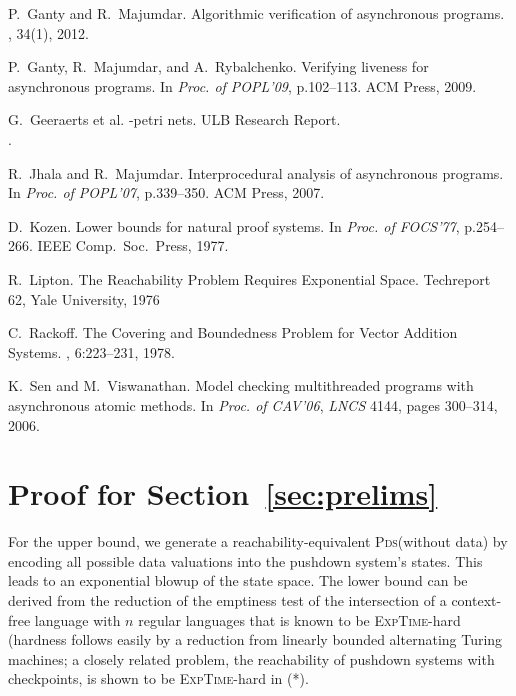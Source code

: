 \documentclass[runningheads,oribibl,]{article}
\newcommand{\pds}{\textsc{Pds}\xspace}
\newcommand{\dexptime}{\textsc{ExpTime}\xspace}
\newenvironment{proof}{\noindent{\it Proof.\hspace*{.5cm}}}{}
\begin{document}
\begin{thebibliography}{10}
P.~Ganty and R.~Majumdar.
\nb Algorithmic verification of asynchronous programs.
, 34(1), 2012.

P.~Ganty, R.~Majumdar, and A.~Rybalchenko.
\nb Verifying liveness for asynchronous programs.
\nb In {\em Proc. of POPL'09}, p.102--113. ACM Press, 2009.

G.~Geeraerts et al.
\nb {$\omega$}-petri nets.
\nb ULB Research Report.\\
\nb
{}.

R.~Jhala and R.~Majumdar.
\nb Interprocedural analysis of asynchronous programs.
\nb In {\em Proc. of POPL'07}, p.339--350. ACM Press, 2007.

D.~Kozen.
\nb Lower bounds for natural proof systems.
\nb In {\em Proc. of FOCS'77}, p.254--266. IEEE Comp.\ Soc.\ Press,
  1977.

R.~Lipton.
\nb The Reachability Problem Requires Exponential Space.
\nb  Techreport 62, Yale University, 1976

C.~Rackoff.
\nb The Covering and Boundedness Problem for Vector Addition Systems.
, 6:223–231, 1978.

K.~Sen and M.~Viswanathan.
\nb Model checking multithreaded programs with asynchronous atomic
  methods.
\nb In {\em Proc. of CAV'06}, {\em {LNCS}} 4144, pages
  300--314, 2006.

\end{thebibliography}


\clearpage
\appendix










\section{Proof for Section~\ref{sec:prelims}}
\propreachpdsdata*
\begin{proof}
  For the upper bound, we generate a reachability-equivalent
  \pds (without data)
  by encoding all possible data valuations into the pushdown system's
  states. This leads to an exponential blowup of the state space.
  The lower bound can be derived from the reduction
of the emptiness test of the intersection of a context-free language
with
$n$ regular languages that is known to be \dexptime-hard (hardness follows
easily by a reduction from linearly bounded alternating Turing machines;
a closely related problem, the reachability of pushdown systems with
checkpoints, is shown to be \dexptime-hard
in (*).\end{proof}
\end{document}

